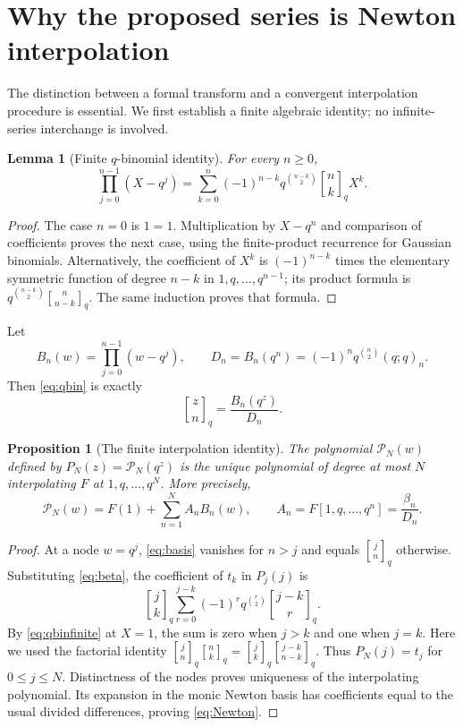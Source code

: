 \documentclass[11pt,letterpaper]{article}
\newtheorem{lemma}[theorem]{Lemma}
\newtheorem{proposition}[theorem]{Proposition}
\theoremstyle{definition}\newtheorem{definition}[theorem]{Definition}
\theoremstyle{remark}\newtheorem{remark}[theorem]{Remark}
\newcommand{\qb}[2]{\genfrac{[}{]}{0pt}{}{#1}{#2}_{\!q}}
\numberwithin{equation}{section}
\begin{document}
\section{Why the proposed series is Newton interpolation}\label{sec:newton}

The distinction between a formal transform and a convergent interpolation procedure is essential. We first establish a finite algebraic identity; no infinite-series interchange is involved.

\begin{lemma}[Finite $q$-binomial identity]\label{lem:qbinfinite}
For every $n\geq0$,
\begin{equation}\label{eq:qbinfinite}
 \prod_{j=0}^{n-1}(X-q^j)
 =\sum_{k=0}^{n}(-1)^{n-k}q^{\binom{n-k}{2}}\qb nk X^k.
\end{equation}
\end{lemma}
\begin{proof}
The case $n=0$ is $1=1$. Multiplication by $X-q^n$ and comparison of coefficients proves the next case, using the finite-product recurrence for Gaussian binomials. Alternatively, the coefficient of $X^k$ is $(-1)^{n-k}$ times the elementary symmetric function of degree $n-k$ in $1,q,\ldots,q^{n-1}$; its product formula is $q^{\binom{n-k}{2}}\qb n{n-k}$. The same induction proves that formula.
\end{proof}

Let
\begin{equation}\label{eq:Bpoly}
 B_n(w)=\prod_{j=0}^{n-1}(w-q^j),\qquad
 D_n=B_n(q^n)=(-1)^nq^{\binom n2}(q;q)_n.
\end{equation}
Then \eqref{eq:qbin} is exactly
\begin{equation}\label{eq:basis}
 \qb zn=\frac{B_n(q^z)}{D_n}.
\end{equation}

\begin{proposition}[The finite interpolation identity]\label{prop:interpolation}
The polynomial $\mathcal P_N(w)$ defined by $P_N(z)=\mathcal P_N(q^z)$ is the unique polynomial of degree at most $N$ interpolating $F$ at $1,q,\ldots,q^N$. More precisely,
\begin{equation}\label{eq:Newton}
 \mathcal P_N(w)=F(1)+\sum_{n=1}^{N}A_nB_n(w),\qquad
 A_n=F[1,q,\ldots,q^n]=\frac{\beta_n}{D_n}.
\end{equation}
\end{proposition}

\begin{proof}
At a node $w=q^j$, \eqref{eq:basis} vanishes for $n>j$ and equals $\qb jn$ otherwise. Substituting \eqref{eq:beta}, the coefficient of $t_k$ in $P_j(j)$ is
\[
 \qb jk\sum_{r=0}^{j-k}(-1)^r q^{\binom r2}\qb{j-k}{r}.
\]
By \eqref{eq:qbinfinite} at $X=1$, the sum is zero when $j>k$ and one when $j=k$. Here we used the factorial identity $\qb jn\qb nk=\qb jk\qb{j-k}{n-k}$. Thus $P_N(j)=t_j$ for $0\leq j\leq N$. Distinctness of the nodes proves uniqueness of the interpolating polynomial. Its expansion in the monic Newton basis has coefficients equal to the usual divided differences, proving \eqref{eq:Newton}.
\end{proof}
\end{document}
